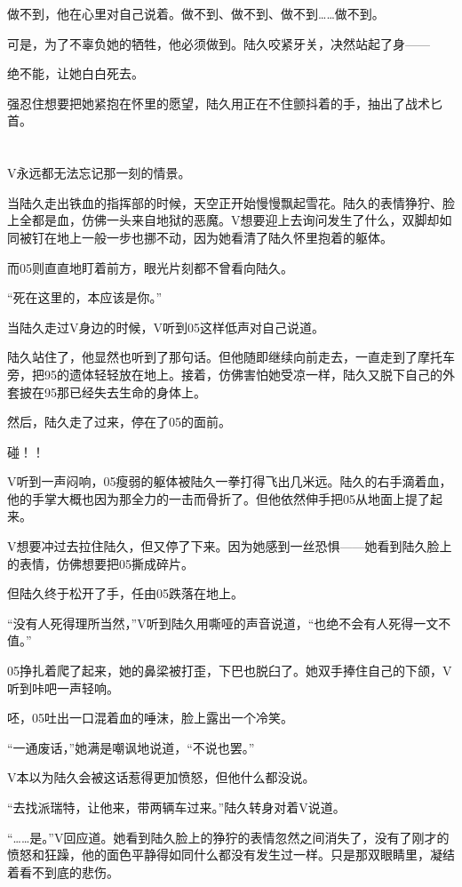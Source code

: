 做不到，他在心里对自己说着。做不到、做不到、做不到……做不到。

可是，为了不辜负她的牺牲，他必须做到。陆久咬紧牙关，决然站起了身——

绝不能，让她白白死去。

强忍住想要把她紧抱在怀里的愿望，陆久用正在不住颤抖着的手，抽出了战术匕首。

\section*{}

V永远都无法忘记那一刻的情景。

当陆久走出铁血的指挥部的时候，天空正开始慢慢飘起雪花。陆久的表情狰狞、脸上全都是血，仿佛一头来自地狱的恶魔。V想要迎上去询问发生了什么，双脚却如同被钉在地上一般一步也挪不动，因为她看清了陆久怀里抱着的躯体。

而05则直直地盯着前方，眼光片刻都不曾看向陆久。

“死在这里的，本应该是你。”

当陆久走过V身边的时候，V听到05这样低声对自己说道。

陆久站住了，他显然也听到了那句话。但他随即继续向前走去，一直走到了摩托车旁，把95的遗体轻轻放在地上。接着，仿佛害怕她受凉一样，陆久又脱下自己的外套披在95那已经失去生命的身体上。

然后，陆久走了过来，停在了05的面前。

碰！！

V听到一声闷响，05瘦弱的躯体被陆久一拳打得飞出几米远。陆久的右手滴着血，他的手掌大概也因为那全力的一击而骨折了。但他依然伸手把05从地面上提了起来。

V想要冲过去拉住陆久，但又停了下来。因为她感到一丝恐惧——她看到陆久脸上的表情，仿佛想要把05撕成碎片。

但陆久终于松开了手，任由05跌落在地上。

“没有人死得理所当然，”V听到陆久用嘶哑的声音说道，“也绝不会有人死得一文不值。”

05挣扎着爬了起来，她的鼻梁被打歪，下巴也脱臼了。她双手捧住自己的下颌，V听到咔吧一声轻响。

呸，05吐出一口混着血的唾沫，脸上露出一个冷笑。

“一通废话，”她满是嘲讽地说道，“不说也罢。”

V本以为陆久会被这话惹得更加愤怒，但他什么都没说。

“去找派瑞特，让他来，带两辆车过来。”陆久转身对着V说道。

“……是。”V回应道。她看到陆久脸上的狰狞的表情忽然之间消失了，没有了刚才的愤怒和狂躁，他的面色平静得如同什么都没有发生过一样。只是那双眼睛里，凝结着看不到底的悲伤。

